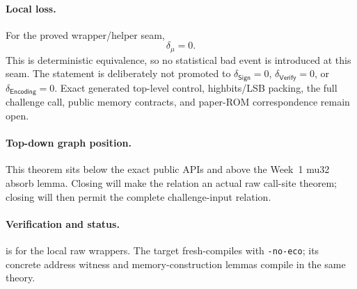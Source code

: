 \paragraph{Local loss.}
For the proved wrapper/helper seam,
\[
  \delta_\mu=0.
\]
This is deterministic equivalence, so no statistical bad event is introduced
at this seam. The statement is deliberately not promoted to
\(\delta_{\mathsf{Sign}}=0\), \(\delta_{\mathsf{Verify}}=0\), or
\(\delta_{\mathsf{Encoding}}=0\). Exact generated top-level control,
highbits/LSB packing, the full challenge call, public memory contracts, and
paper-ROM correspondence remain open.

\paragraph{Top-down graph position.}
This theorem sits below the exact public APIs and above the Week~1 mu32 absorb
lemma. Closing  will make the relation an
actual raw call-site theorem; closing  will then
permit the complete challenge-input relation.

\paragraph{Verification and status.}
 is  for the local raw wrappers.
The target fresh-compiles with \texttt{-no-eco}; its concrete address witness
and memory-construction lemmas compile in the same theory.
